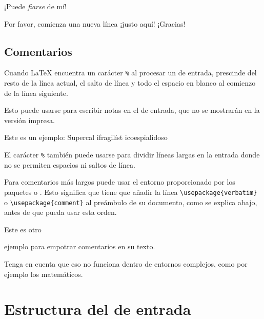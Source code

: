 \begin{example}
¡Puede \textsl{fiarse} de mí!
\end{example}

\begin{example}
Por favor, comienza una nueva
línea ¡justo aquí!\newline
¡Gracias!
\end{example}

\subsection{Comentarios}

Cuando \LaTeX{} encuentra un carácter \verb|%| al procesar un \filenomo{} de entrada, prescinde del resto de la línea actual, el salto de línea y todo el espacio en blanco al comienzo de la línea siguiente.

Esto puede usarse para escribir notas en el \filenomo{} de entrada, que no se mostrarán en la versión impresa.

\begin{example}
Este es un %
ejemplo: Supercal%
              ifragilíst%
    icoespialidoso
\end{example}

El carácter \texttt{\%} también puede usarse para dividir líneas largas en la entrada donde no se permiten espacios ni saltos de línea.

Para comentarios más largos puede usar el entorno  proporcionado por los paquetes  o .  Esto significa que tiene que añadir la línea \verb|\usepackage{verbatim}| o \verb|\usepackage{comment}| al preámbulo de su documento, como se explica abajo, antes de que pueda usar esta orden.

\begin{example}
Este es otro
\begin{comment}
bastante estúpido,
pero útil
\end{comment}
ejemplo para empotrar
comentarios en su texto.
\end{example}

Tenga en cuenta que eso no funciona dentro de entornos complejos, como
por ejemplo los matemáticos.

\section{Estructura del \filenomo{} de entrada}

